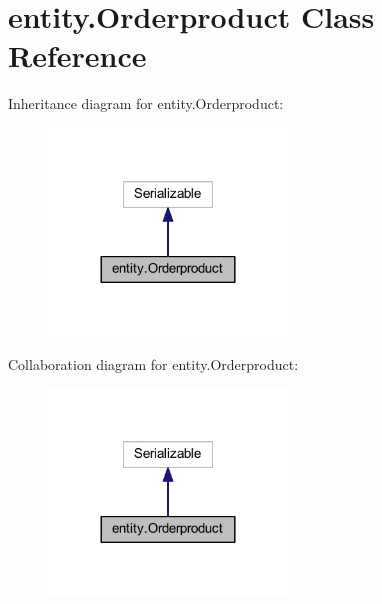 \hypertarget{classentity_1_1_orderproduct}{}\section{entity.\+Orderproduct Class Reference}
\label{classentity_1_1_orderproduct}


Inheritance diagram for entity.\+Orderproduct\+:\nopagebreak
\begin{figure}[H]
\begin{center}
\leavevmode
\includegraphics[width=180pt]{classentity_1_1_orderproduct__inherit__graph}
\end{center}
\end{figure}


Collaboration diagram for entity.\+Orderproduct\+:\nopagebreak
\begin{figure}[H]
\begin{center}
\leavevmode
\includegraphics[width=180pt]{classentity_1_1_orderproduct__coll__graph}
\end{center}
\end{figure}
